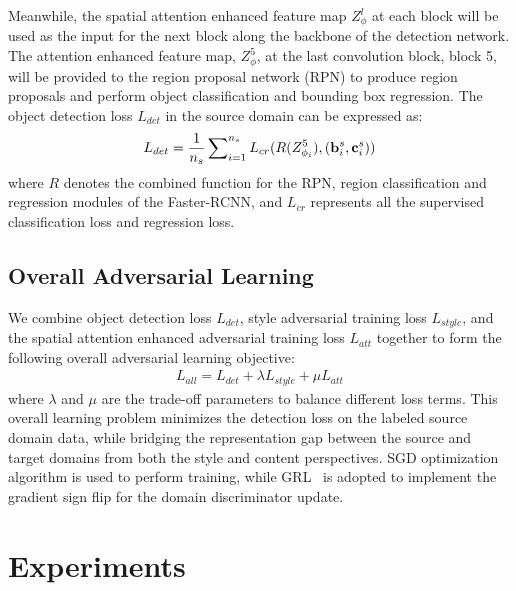 \documentclass[runningheads]{llncs}
\begin{document}
Meanwhile, the spatial attention enhanced feature map $Z^l_\phi$ at each block will be used as the input for the next block
along the backbone of the detection network. 
The attention enhanced feature map, ${Z^5_\phi}$, 
at the last convolution block, block 5, will be provided to the region proposal network (RPN) 
to produce region proposals and perform object classification and bounding box regression. 
The object detection loss $L_{det}$ in the source domain can be expressed as:
\begin{gather}
\begin{split}
	{L_{det}} =  \frac{1}{{{n_s}}}\sum\nolimits_{i = 1}^{{n_s}} {{L_{cr}}}(R(Z^{5}_{\phi_{i}} ),({\bf b}_i^s,{\bf c}_i^s))
\end{split}
\end{gather}
where $R$ denotes the combined function for the RPN, region classification and regression modules
of the Faster-RCNN, and $L_{cr}$ represents all the supervised classification loss and regression loss. 




\subsection{Overall Adversarial Learning}
We combine object detection loss $L_{det}$, style adversarial training loss $L_{style}$, 
and the spatial attention enhanced adversarial training loss $L_{att}$ together to 
form the following overall adversarial learning objective:
\begin{align}
{L_{all}} = {L_{det}} + \lambda {L_{style}} + \mu {L_{att}}
\label{eq11}
\end{align}
where $\lambda$ and $\mu$ are the trade-off parameters to balance different loss terms. 
This overall learning problem minimizes the detection loss on the labeled source domain data,
while bridging the representation gap between the source and target domains from both the style 
and content perspectives.
SGD optimization algorithm is used to perform training, while
GRL~\cite{ganin2016domain} is adopted to implement the gradient sign flip for the domain discriminator update. 




\section{Experiments}
\end{document}
